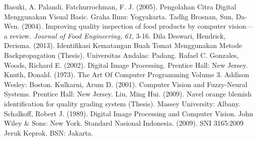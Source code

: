 \documentclass[laporan.tex]{subfiles}
\begin{document}
\begin{thebibliography}{99}
 Basuki, A. Palandi, Fatchurrochman, F. J. (2005). Pengolahan Citra Digital Menggunakan Visual Basic. Graha Ilmu: Yogyakarta.
 Tadhg Brosnan, Sun, Da-Wen. (2004). Improving quality inspection of food products by computer vision––a review. \emph{Journal of Food Engineering, 61}, 3-16.
 Dila Deswari, Hendrick, Derisma. (2013). Identifikasi Kematangan Buah Tomat Menggunakan Metode Backpropagation (Thesis). Universitas Andalas: Padang.
 Rafael C. Gonzales, Woods, Richard E. (2002). Digital Image Processing. Prentice Hall: New Jersey.
 Knuth, Donald. (1973). The Art Of Computer Programming Volume 3. Addison Wesley: Boston.
 Kulkarni, Arum D. (2001). Computer Vision and Fuzzy-Neural Systems. Prentice Hall: New Jersey.
 Liu, Ming Hui. (2009). Navel orange blemish identification for quality grading system (Thesis). Massey University: Albany.
 Schalkoff, Robert J. (1989). Digital Image Processing and Computer Vision. John Wiley \& Sons: New York.
 Standard Nasional Indonesia. (2009). SNI 3165:2009 Jeruk Keprok. BSN: Jakarta.
\end{thebibliography}
\end{document}
